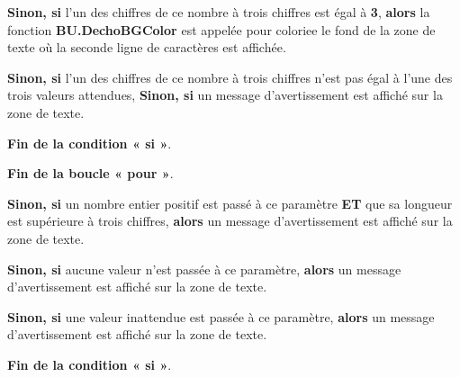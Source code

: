 \documentclass[a4paper,10pt]{article}
\begin{document}
\begin{itemize}
{\begin{justify}
{\begin{itemize}
{                        \begin{justify}
                            \textbf{\color{cond}Sinon, si} l'un des chiffres de ce nombre à trois chiffres est égal à \textbf{3}, \textbf{\color{cond}alors} la fonction \textbf{\color{func}BU.DechoBGColor} est appelée pour coloriee le fond de la zone de texte où la seconde ligne de caractères est affichée.
                        \end{justify}\setlength{\parskip}{1em}

                        \begin{justify}
                            \textbf{\color{cond}Sinon, si} l'un des chiffres de ce nombre à trois chiffres n'est pas égal à l'une des trois valeurs attendues, \textbf{\color{cond}Sinon, si} un message d'avertissement est affiché sur la zone de texte.
                        \end{justify}\setlength{\parskip}{1em}

                        \begin{justify}
                            \textbf{\color{cond}Fin de la condition « si »}.
                        \end{justify}
                    }
                \end{itemize}

                \begin{justify}
                    \textbf{\color{loop}Fin de la boucle « pour »}.
                \end{justify}
            }
        \end{justify}

        \item
        {
            \begin{justify}
                \textbf{\color{cond}Sinon, si} un nombre entier positif est passé à ce paramètre \textbf{ET} que sa longueur est supérieure à trois chiffres, \textbf{\color{cond}alors} un message d'avertissement est affiché sur la zone de texte.
            \end{justify}

            \setlength{\parskip}{1em}

            \begin{justify}
                \textbf{\color{cond}Sinon, si} aucune valeur n'est passée à ce paramètre, \textbf{\color{cond}alors} un message d'avertissement est affiché sur la zone de texte.
            \end{justify}

            \begin{justify}
                \textbf{\color{cond}Sinon, si} une valeur inattendue est passée à ce paramètre, \textbf{\color{cond}alors} un message d'avertissement est affiché sur la zone de texte.
            \end{justify}

            \begin{justify}
                \textbf{\color{cond}Fin de la condition « si »}.
            \end{justify}
        }
    }
\end{itemize}
\end{document}
